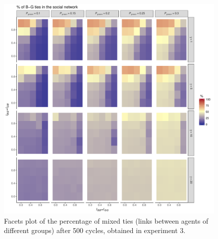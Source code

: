 \begin{figure}[ht!]
	\label{fig:pctMixedTiesExperiment3}
	\begin{minipage}[c]{0.2\linewidth}
		\caption{Facets plot of the percentage of mixed ties (links between agents of different groups) after 500 cycles, obtained in experiment 3.}
	\end{minipage}
	\begin{minipage}[c]{0.75\linewidth}
		\includegraphics[trim={0cm 0cm 0.4cm 0cm}, clip, width=\linewidth]{figures/pctMixedTiesExperiment3.pdf}
	\end{minipage}
\end{figure}


